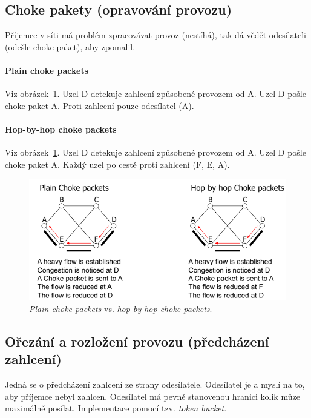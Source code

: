 \subsection{Choke pakety (opravování provozu)}

Příjemce v síti má problém zpracovávat provoz (nestíhá), tak dá vědět odesílateli (odešle choke paket), aby zpomalil.

\paragraph*{Plain choke packets} Viz obrázek~\ref{pds_choke_packets}. Uzel D detekuje zahlcení způsobené provozem od A. Uzel D pošle choke paket A. Proti zahlcení  pouze odesílatel (A).

\paragraph*{Hop-by-hop choke packets} Viz obrázek~\ref{pds_choke_packets}. Uzel D detekuje zahlcení způsobené provozem od A. Uzel D pošle choke paket A. Každý uzel po cestě  proti zahlcení (F, E, A).

\begin{figure}[H]
    \centering
    \includegraphics[width=1\linewidth]{choke_packets.png}
    \caption{\textit{Plain choke packets} vs. \textit{hop-by-hop choke packets}.}
    \label{pds_choke_packets}
\end{figure}

\subsection{Ořezání a rozložení provozu (předcházení zahlcení)}

Jedná se o předcházení zahlcení ze strany odesílatele. Odesílatel je  a myslí na to, aby příjemce nebyl zahlcen. Odesílatel má pevně stanovenou hranici kolik můze maximálně posílat. Implementace pomocí tzv. \textit{token bucket}.


